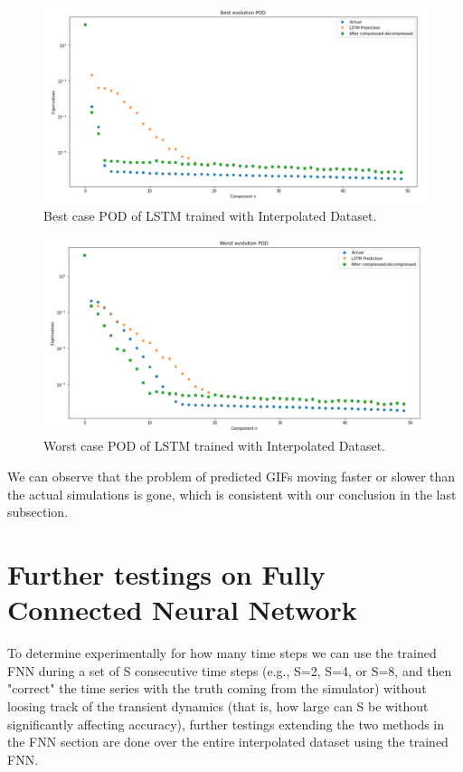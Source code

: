 \begin{figure}[H]
    \caption{Best case POD of LSTM trained with Interpolated Dataset.}
    \includegraphics[scale=0.5]{figures/mantle_convection_images/larger_dataset_interpolated/LSTM_Best_POD.png}
\end{figure}

\begin{figure}[H]
    \caption{Worst case POD of LSTM trained with Interpolated Dataset.}
    \includegraphics[scale=0.5]{figures/mantle_convection_images/larger_dataset_interpolated/LSTM_Worst_POD.png}
\end{figure}


We can observe that the problem of predicted GIFs moving faster or slower than the actual simulations is gone, which is consistent with our conclusion in the last subsection.




\section{Further testings on Fully Connected Neural Network}

To determine experimentally for how many time steps we can use the trained FNN during a set of S consecutive time steps (e.g., S=2, S=4, or S=8, and then "correct" the time series with the truth coming from the simulator) without loosing track of the transient dynamics (that is, how large can S be without significantly affecting accuracy), further testings extending the two methods in the FNN section are done over the entire interpolated dataset using the trained FNN.

